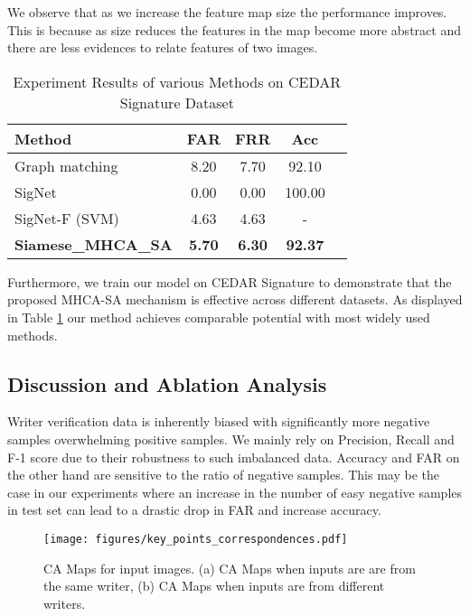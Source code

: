 \documentclass[a4paper,conference]{IEEEtran}
\begin{document}
We observe that as we increase the feature map size the performance improves. This is because as size reduces the features in the map become more abstract and there are less evidences to relate features of two images. \cite{zhang_self-attention_2019}
\begin{table}[!htp]\centering
\caption{Experiment Results of various Methods on CEDAR Signature Dataset}\label{tab:sign_compare}
\scriptsize
\begin{tabular}{lcccc}\toprule
\textbf{Method} &\textbf{FAR} &\textbf{FRR} &\textbf{Acc} \\\midrule
Graph matching \cite{chen_graph_signature} &8.20 &7.70 &92.10 \\
SigNet \cite{dey2017signet} &0.00 &0.00 &100.00 \\
SigNet-F (SVM) \cite{Hafemann_2017} &4.63 &4.63 &- \\
\textbf{Siamese\_MHCA\_SA} &\textbf{5.70} &\textbf{6.30} &\textbf{92.37} \\
\bottomrule
\end{tabular}
\end{table}
\newline \indent Furthermore, we train our model on CEDAR Signature \cite{signature_verif_dataset} to demonstrate that the proposed MHCA-SA mechanism is effective across different datasets. As displayed in Table \ref{tab:sign_compare} our method achieves comparable potential with most widely used methods. 
\subsection{Discussion and Ablation Analysis}
Writer verification data is inherently biased with significantly more negative samples overwhelming positive samples. We mainly rely on Precision, Recall and F-1 score due to their robustness to such imbalanced data. Accuracy and FAR on the other hand are sensitive to the ratio of negative samples. This may be the case in our experiments where an increase in the number of easy negative samples in test set can lead to a drastic drop in FAR and increase accuracy. 
\begin{figure}[!htp]
\begin{center}
\texttt{[image: figures/key\_points\_correspondences.pdf]}
\caption{\label{fig:ca_attentionmaps} CA Maps for input images. (a) CA Maps when inputs are are from the same writer, (b) CA Maps when inputs are from different writers.}
\end{center}
\end{figure}
\end{document}
